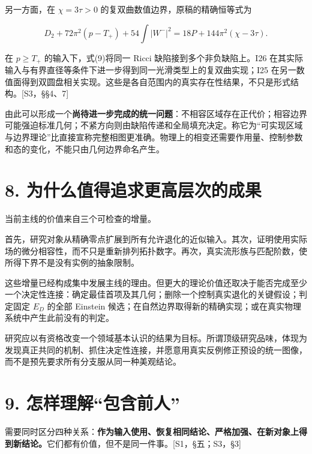 \documentclass[UTF8,a4paper,11pt,fontset=fandol]{ctexart}
\begin{document}
另一方面，在 \(\chi=3\tau>0\) 的复双曲数值边界，原稿的精确恒等式为

\[
\boxed{
D_2+72\pi^2(p-T_+)+54\int|W^-|^2
=18P+144\pi^2(\chi-3\tau).
}
\tag{9}
\]

在 \(p\ge T_+\) 的输入下，式(9)将同一 Ricci 缺陷接到多个非负缺陷上。I26
在其实际输入与有界直径等条件下进一步得到同一光滑类型上的复双曲实现；I25
在另一数值面得到双圆盘相关实现。这些是各自范围内的真实存在性结果，不只是形式结构。{[}S3，§§4、7{]}

由此可以形成一个\textbf{尚待进一步完成的统一问题}：不相容区域存在正代价；相容边界可能强迫标准几何；不紧方向则由缺陷传递和全局填充决定。称它为``可实现区域与边界理论''比直接宣称完整相图更准确。物理上的相变还需要作用量、控制参数和态的变化，不能只由几何边界命名产生。

\section{8.
为什么值得追求更高层次的成果}\label{ux4e3aux4ec0ux4e48ux503cux5f97ux8ffdux6c42ux66f4ux9ad8ux5c42ux6b21ux7684ux6210ux679c}

当前主线的价值来自三个可检查的增量。

首先，研究对象从精确零点扩展到所有允许退化的近似输入。其次，证明使用实际场的微分相容性，而不只是重新排列拓扑数字。再次，真实流形族与匹配阶数，使所得下界不是没有实例的抽象限制。

这些增量已经构成集中发展主线的理由。但更大的理论价值还取决于能否完成至少一个决定性连接：确定最佳首项及其几何；删除一个控制真实退化的关键假设；判定固定
\(E_D\) 的全部 Einstein
候选；在自然边界取得新的精确实现；或在真实物理系统中产生此前没有的判定。

研究应以有资格改变一个领域基本认识的结果为目标。所谓顶级研究品味，体现为发现真正共同的机制、抓住决定性连接，并愿意用真实反例修正预设的统一图像，而不是预先要求所有分支服从同一种美观结论。

\section{9.
怎样理解``包含前人''}\label{ux600eux6837ux7406ux89e3ux5305ux542bux524dux4eba}

需要同时区分四种关系：\textbf{作为输入使用、恢复相同结论、严格加强、在新对象上得到新结论。}它们都有价值，但不是同一件事。{[}S1，§五；S3，§3{]}
\end{document}
